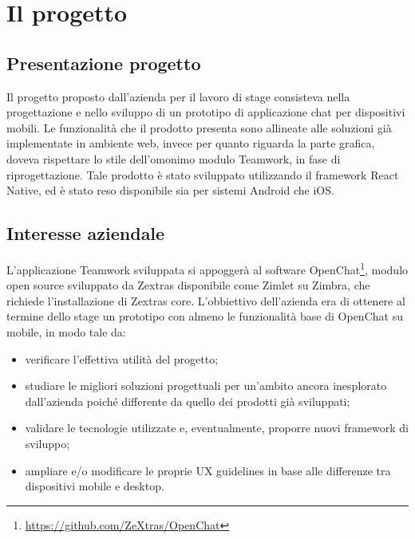
\chapter{Il progetto}\label{chap:project}
\section{Presentazione progetto}
Il progetto proposto dall'azienda per il lavoro di stage consisteva nella progettazione e nello sviluppo di un prototipo di applicazione chat per dispositivi mobili. Le funzionalità che il prodotto presenta sono allineate alle soluzioni già implementate in ambiente web, invece per quanto riguarda la parte grafica, doveva rispettare lo stile dell'omonimo modulo Teamwork, in fase di riprogettazione. Tale prodotto è stato sviluppato utilizzando il framework React Native, ed è stato reso disponibile sia per sistemi Android che iOS.

\section{Interesse aziendale} \label{sec:intaz}
L'applicazione Teamwork sviluppata si appoggerà al software OpenChat\footnote{\url{https://github.com/ZeXtras/OpenChat}}, modulo open source sviluppato da Zextras disponibile come Zimlet su Zimbra, che richiede l'installazione di Zextras core.
L'obbiettivo dell'azienda era di ottenere al termine dello stage un prototipo con almeno le funzionalità base di OpenChat su mobile, in modo tale da:
\begin{itemize}
	\item verificare l'effettiva utilità del progetto;
	\item studiare le migliori soluzioni progettuali per un'ambito ancora inesplorato dall'azienda poiché differente da quello dei prodotti già sviluppati;
	\item validare le tecnologie utilizzate e, eventualmente, proporre nuovi framework di sviluppo;
	\item ampliare e/o modificare le proprie UX guidelines in base alle differenze tra dispositivi mobile e desktop.
\end{itemize}


